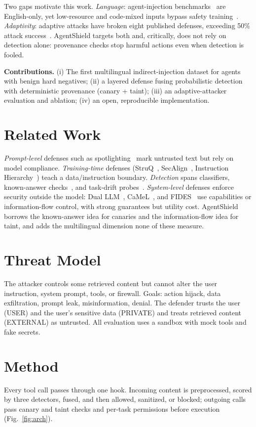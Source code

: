 \documentclass[conference]{IEEEtran}
\begin{document}
Two gaps motivate this work. \emph{Language}: agent-injection benchmarks~\cite{agentdojo,injecagent,bipia}
are English-only, yet low-resource and code-mixed inputs bypass safety training~\cite{multijail,lowres}.
\emph{Adaptivity}: adaptive attacks have broken eight published defenses, exceeding 50\% attack
success~\cite{adaptive}. AgentShield targets both and, critically, does not rely on detection alone:
provenance checks stop harmful actions even when detection is fooled.

\textbf{Contributions.} (i) The first multilingual indirect-injection dataset for agents with benign
hard negatives; (ii) a layered defense fusing probabilistic detection with deterministic provenance
(canary + taint); (iii) an adaptive-attacker evaluation and ablation; (iv) an open, reproducible
implementation.

\section{Related Work}
\emph{Prompt-level} defenses such as spotlighting~\cite{spotlight} mark untrusted text but rely on
model compliance. \emph{Training-time} defenses (StruQ~\cite{struq}, SecAlign~\cite{secalign},
Instruction Hierarchy~\cite{hierarchy}) teach a data/instruction boundary. \emph{Detection} spans
classifiers, known-answer checks~\cite{liu,datasentinel}, and task-drift probes~\cite{taskdrift}.
\emph{System-level} defenses enforce security outside the model: Dual LLM~\cite{dualllm},
CaMeL~\cite{camel}, and FIDES~\cite{fides} use capabilities or information-flow control, with strong
guarantees but utility cost. AgentShield borrows the known-answer idea for canaries and the
information-flow idea for taint, and adds the multilingual dimension none of these measure.

\section{Threat Model}
The attacker controls some retrieved content but cannot alter the user instruction, system prompt,
tools, or firewall. Goals: action hijack, data exfiltration, prompt leak, misinformation, denial.
The defender trusts the user (USER) and the user's sensitive data (PRIVATE) and treats retrieved
content (EXTERNAL) as untrusted. All evaluation uses a sandbox with mock tools and fake secrets.

\section{Method}
Every tool call passes through one hook. Incoming content is preprocessed, scored by three
detectors, fused, and then allowed, sanitized, or blocked; outgoing calls pass canary and taint
checks and per-task permissions before execution (Fig.~\ref{fig:arch}).
\end{document}
